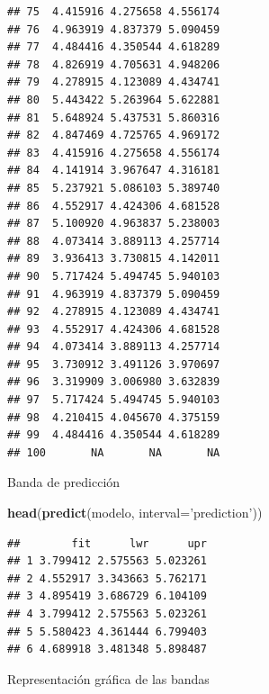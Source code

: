 \documentclass[]{book}
\newenvironment{Shaded}{\begin{snugshade}}{\end{snugshade}}
\newcommand{\KeywordTok}[1]{\textcolor[rgb]{0.13,0.29,0.53}{\textbf{#1}}}
\newcommand{\DataTypeTok}[1]{\textcolor[rgb]{0.13,0.29,0.53}{#1}}
\newcommand{\StringTok}[1]{\textcolor[rgb]{0.31,0.60,0.02}{#1}}
\newcommand{\NormalTok}[1]{#1}
\begin{document}
\begin{verbatim}
## 75  4.415916 4.275658 4.556174
## 76  4.963919 4.837379 5.090459
## 77  4.484416 4.350544 4.618289
## 78  4.826919 4.705631 4.948206
## 79  4.278915 4.123089 4.434741
## 80  5.443422 5.263964 5.622881
## 81  5.648924 5.437531 5.860316
## 82  4.847469 4.725765 4.969172
## 83  4.415916 4.275658 4.556174
## 84  4.141914 3.967647 4.316181
## 85  5.237921 5.086103 5.389740
## 86  4.552917 4.424306 4.681528
## 87  5.100920 4.963837 5.238003
## 88  4.073414 3.889113 4.257714
## 89  3.936413 3.730815 4.142011
## 90  5.717424 5.494745 5.940103
## 91  4.963919 4.837379 5.090459
## 92  4.278915 4.123089 4.434741
## 93  4.552917 4.424306 4.681528
## 94  4.073414 3.889113 4.257714
## 95  3.730912 3.491126 3.970697
## 96  3.319909 3.006980 3.632839
## 97  5.717424 5.494745 5.940103
## 98  4.210415 4.045670 4.375159
## 99  4.484416 4.350544 4.618289
## 100       NA       NA       NA
\end{verbatim}

Banda de predicción

\begin{Shaded}
\begin{Highlighting}[]
\KeywordTok{head}\NormalTok{(}\KeywordTok{predict}\NormalTok{(modelo, }\DataTypeTok{interval=}\StringTok{'prediction'}\NormalTok{))}
\end{Highlighting}
\end{Shaded}

\begin{verbatim}
##        fit      lwr      upr
## 1 3.799412 2.575563 5.023261
## 2 4.552917 3.343663 5.762171
## 3 4.895419 3.686729 6.104109
## 4 3.799412 2.575563 5.023261
## 5 5.580423 4.361444 6.799403
## 6 4.689918 3.481348 5.898487
\end{verbatim}

Representación gráfica de las bandas
\end{document}

